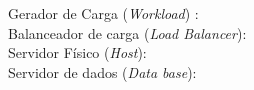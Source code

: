 \begin{description}
	\item[Gerador de Carga (\textit{Workload}) :]
	\item[Balanceador de carga (\textit{Load Balancer}):]
	\item[Servidor Físico (\textit{Host}):]
	\item[Servidor de dados (\textit{Data base}):]	
\end{description}







